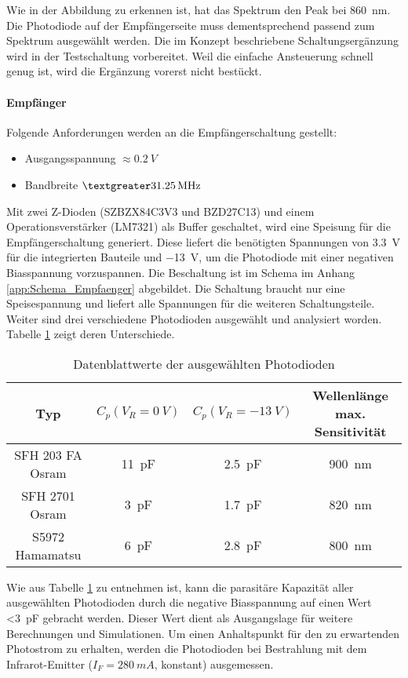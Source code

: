 Wie in der Abbildung zu erkennen ist, hat das Spektrum den Peak bei \SI{860}{nm}. Die Photodiode auf der Empfängerseite muss dementsprechend passend zum Spektrum ausgewählt werden. Die im Konzept beschriebene Schaltungsergänzung wird in der Testschaltung vorbereitet. Weil die einfache Ansteuerung schnell genug ist, wird die Ergänzung vorerst nicht bestückt.

\paragraph{Empfänger}
Folgende Anforderungen werden an die Empfängerschaltung gestellt:
\begin{itemize}
	\item Ausgangsspannung $\approx \SI{0.2}{V}$
	\item Bandbreite $\textgreater \SI{31.25}{MHz}$
\end{itemize}
Mit zwei Z-Dioden (SZBZX84C3V3 und BZD27C13) und einem Operationsverstärker (LM7321) als Buffer geschaltet, wird eine Speisung für die Empfängerschaltung generiert. Diese liefert die benötigten Spannungen von \SI{3.3}{V} für die integrierten Bauteile und \SI{-13}{V}, um die Photodiode mit einer negativen Biasspannung vorzuspannen. Die Beschaltung ist im Schema im Anhang \ref{app:Schema_Empfaenger} abgebildet. Die Schaltung braucht nur eine Speisespannung und liefert alle Spannungen für die weiteren Schaltungsteile.
\newline
Weiter sind drei verschiedene Photodioden ausgewählt und analysiert worden. Tabelle \ref{tab:Tabelle_Photo} zeigt deren Unterschiede.

\begin{table}[H]
\begin{tabular}{c|c|c|c}
	\normalfont\textbf{Typ}&\normalfont\textbf{$C_{p} (V_{R}=\SI{0}{V})$}  & \normalfont\textbf{$C_{p} (V_{R}=\SI{-13}{V})$} & \normalfont\textbf{Wellenlänge max. Sensitivität} \\ \hline\hline
	SFH 203 FA Osram&\SI{11}{pF}  & \SI{2.5}{pF} & \SI{900}{nm} \\ 
	\hline 
	SFH 2701 Osram&\SI{3}{pF}  &\SI{1.7}{pF}  &\SI{820}{nm}  \\ 
	\hline 
	S5972 Hamamatsu&\SI{6}{pF}  &\SI{2.8}{pF}  &\SI{800}{nm}  \\ 
	\hline 
\end{tabular} 
\caption{Datenblattwerte der ausgewählten Photodioden}\label{tab:Tabelle_Photo}
\end{table}

Wie aus Tabelle \ref{tab:Tabelle_Photo} zu entnehmen ist, kann die parasitäre Kapazität aller ausgewählten Photodioden durch die negative Biasspannung auf einen Wert \textless \SI{3}{pF} gebracht werden. Dieser Wert dient als Ausgangslage für weitere Berechnungen und Simulationen.
\newline
Um einen Anhaltspunkt für den zu erwartenden Photostrom zu erhalten, werden die Photodioden bei Bestrahlung mit dem Infrarot-Emitter ($I_{F}=\SI{280}{mA}$, konstant) ausgemessen.

